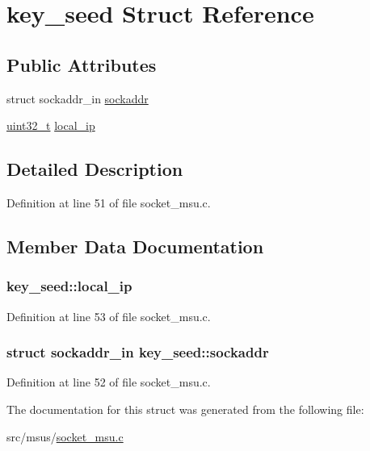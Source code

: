 \hypertarget{structkey__seed}{\section{key\-\_\-seed Struct Reference}
\label{structkey__seed}
}
\subsection*{Public Attributes}
\begin{DoxyCompactItemize}
\item 
struct sockaddr\-\_\-in \hyperlink{structkey__seed_a48fd81b209ca6e3c9bc8a7378fbab98d}{sockaddr}
\item 
\hyperlink{msus_2webserver_2uthash_8h_a435d1572bf3f880d55459d9805097f62}{uint32\-\_\-t} \hyperlink{structkey__seed_a32d3db48f32118ec135d3e1778a97270}{local\-\_\-ip}
\end{DoxyCompactItemize}


\subsection{Detailed Description}


Definition at line 51 of file socket\-\_\-msu.\-c.



\subsection{Member Data Documentation}
\hypertarget{structkey__seed_a32d3db48f32118ec135d3e1778a97270}{
\subsubsection[{local\-\_\-ip}]{ key\-\_\-seed\-::local\-\_\-ip}}\label{structkey__seed_a32d3db48f32118ec135d3e1778a97270}


Definition at line 53 of file socket\-\_\-msu.\-c.

\hypertarget{structkey__seed_a48fd81b209ca6e3c9bc8a7378fbab98d}{
\subsubsection[{sockaddr}]{\setlength{\rightskip}{0pt plus 5cm}struct sockaddr\-\_\-in key\-\_\-seed\-::sockaddr}}\label{structkey__seed_a48fd81b209ca6e3c9bc8a7378fbab98d}


Definition at line 52 of file socket\-\_\-msu.\-c.



The documentation for this struct was generated from the following file\-:\begin{DoxyCompactItemize}
\item 
src/msus/\hyperlink{socket__msu_8c}{socket\-\_\-msu.\-c}\end{DoxyCompactItemize}
